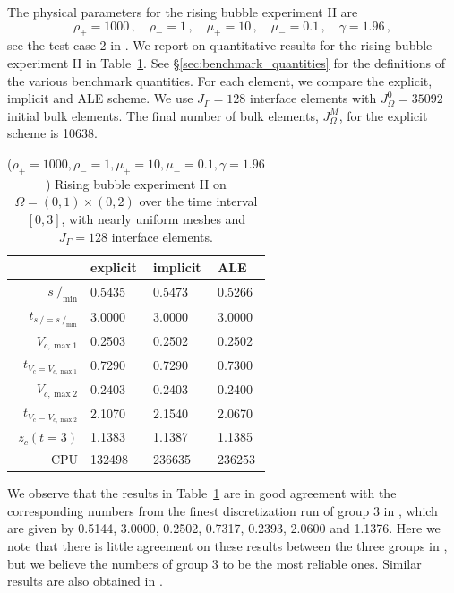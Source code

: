 \documentclass[a4paper,12pt,onecolumn]{article}
\newcommand{\strikes}{\mbox{$s\!\!\!\!\:/$}}
\begin{document}
The physical parameters for the rising bubble experiment II are
\begin{equation} \label{eq:Hysing2}
\rho_+ = 1000\,,\quad \rho_- = 1\,,\quad \mu_+ = 10\,,\quad \mu_- = 0.1\,,\quad
\gamma = 1.96\,,
\end{equation}
see the test case 2 in \cite[Table~I]{HysingTKPBGT09}. We report on
quantitative results for the rising bubble experiment II in
Table~\ref{tab:risingbubbleII}. See \S\ref{sec:benchmark_quantities} for the
definitions of the various benchmark quantities. For each element, we compare
the explicit, implicit and ALE scheme. We use $J_\Gamma=128$ interface elements
with $J_\Omega^0=35092$ initial bulk elements. The final number of bulk
elements, $J_\Omega^M$, for the explicit scheme is 10638.
\begin{table}
\center
\hspace*{-3.25cm}
\begin{tabular}{rlll}
\hline
& explicit & implicit & ALE \\
\hline
$\strikes_{\min}$                & 0.5435 & 0.5473 & 0.5266 \\
$t_{\strikes = \strikes_{\min}}$ & 3.0000 & 3.0000 & 3.0000 \\
$V_{c,\max 1}$                   & 0.2503 & 0.2502 & 0.2502 \\
$t_{V_c = V_{c,\max 1}}$         & 0.7290 & 0.7290 & 0.7300 \\
$V_{c,\max 2}$                   & 0.2403 & 0.2403 & 0.2400 \\
$t_{V_c = V_{c,\max 2}}$         & 2.1070 & 2.1540 & 2.0670 \\
$z_c(t=3)$                       & 1.1383 & 1.1387 & 1.1385 \\
CPU                              & 132498 & 236635 & 236253 \\
\hline
\end{tabular}
\hspace*{-3.25cm}
\caption[Navier--Stokes rising bubble II benchmark values]
{($\rho_+ = 1000,\rho_- = 1,\mu_+ = 10,\mu_- =0.1,\gamma = 1.96$)
Rising bubble experiment II on $\Omega = (0,1) \times (0,2)$ over the time
interval $[0,3]$, with nearly uniform meshes and $J_\Gamma=128$ interface
elements.}
\label{tab:risingbubbleII}
\end{table}
We observe that the results in Table~\ref{tab:risingbubbleII}
are in good agreement with the corresponding numbers from the finest
discretization run of group 3 in \cite{HysingTKPBGT09}, which are given by
0.5144, 3.0000, 0.2502, 0.7317, 0.2393, 2.0600 and 1.1376. Here we note that
there is little agreement on these results between the three groups in
\cite{HysingTKPBGT09}, but we believe the numbers of group 3 to be the most
reliable ones. Similar results are also obtained in \cite{fluidfbp}.
\end{document}
